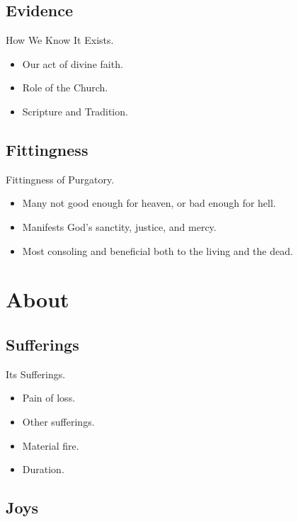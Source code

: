\documentclass{beamer}
\begin{document}
\subsection{Evidence}

\begin{frame}{How We Know It Exists.}
\begin{itemize}
 \item Our act of divine faith.
 \item Role of the Church.
 \item Scripture and Tradition.
\end{itemize}
\end{frame}

\subsection{Fittingness}

\begin{frame}{Fittingness of Purgatory.}
\begin{itemize}
 \item Many not good enough for heaven, or bad enough for hell.
 \item Manifests God's sanctity, justice, and mercy.
 \item Most consoling and beneficial both to the living and the dead.
\end{itemize}
\end{frame}

\section{About}
\subsection{Sufferings}

\begin{frame}{Its Sufferings.}
\begin{itemize}
 \item Pain of loss. 
 \item Other sufferings.
 \item Material fire.
 \item Duration.
\end{itemize}
\end{frame}

\subsection{Joys}
\end{document}
